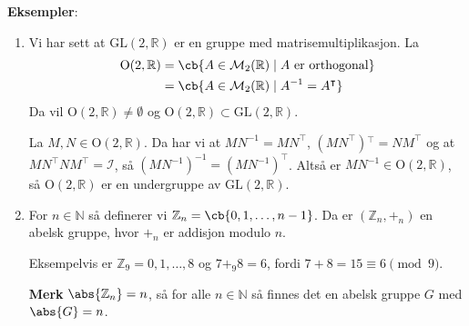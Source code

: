 \textbf{Eksempler}:
\begin{enumerate}
	\item Vi har sett at $\text{GL}(2, \mathbb{R})$ er en gruppe med
	      matrisemultiplikasjon. La
	      \begin{align}
		      \text{O}(2, \mathbb{R})
		       & = \cb{A\in \mathcal{M}_2(\mathbb{R})\mid A \text{ er orthogonal}} \\
		       & = \cb{A\in \mathcal{M}_2(\mathbb{R})\mid A^{-1} = A^\intercal}
	      \end{align}
        Da vil $\text{O}(2, \mathbb{R}) \neq \emptyset$ og 
        $\text{O}(2, \mathbb{R}) \subset \text{GL}(2, \mathbb{R})$.

        La $M, N \in \text{O}(2, \mathbb{R})$. Da har vi at $MN^{-1} = MN^\intercal$,
        $(MN^\intercal ){^\intercal} = NM^\intercal$ og at 
        $MN^\intercal NM^\intercal = \mathcal{I}$, så 
        $(MN^{-1})^{-1} = (MN^{-1})^{\intercal}$. Altså er 
        $MN^{-1} \in \text{O}(2, \mathbb{R})$, så $\text{O}(2, \mathbb{R})$ er en
        undergruppe av $\text{GL}(2, \mathbb{R})$. 
  \item For $n \in \mathbb{N}$ så definerer vi $\mathbb{Z}_n = \cb{0, 1, \dots, n-1}$.
    Da er $(\mathbb{Z}_n, +_n)$ en abelsk gruppe, hvor $+_n$ er addisjon modulo $n$. 

    Eksempelvis er $\mathbb{Z}_9 = {0, 1, \dots, 8}$ og $7 +_9 8 = 6$, fordi
    $7 + 8 = 15 \equiv 6 \pmod{9}$. 

    \textbf{Merk} $\abs{\mathbb{Z}_n} = n$, så for alle $n \in \mathbb{N}$ så finnes
    det en abelsk gruppe $G$ med $\abs{G} = n$. 
\end{enumerate}


